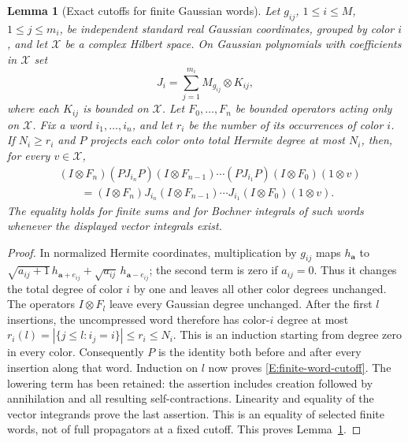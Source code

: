 \documentclass[12pt]{article}
\numberwithin{equation}{section}
\newtheorem{lemma}[theorem]{Lemma}
\theoremstyle{definition}
\begin{document}
\begin{lemma}[Exact cutoffs for finite Gaussian words]\label{L:finite-word-cutoff}
  Let $g_{ij}$, $1\le i\le M$, $1\le j\le m_i$, be independent
  standard real Gaussian coordinates, grouped by color $i$, and let
  $\mathscr X$ be a complex Hilbert space. On Gaussian polynomials
  with coefficients in $\mathscr X$ set
  \[
    J_i=\sum_{j=1}^{m_i}M_{g_{ij}}\otimes K_{ij},
  \]
  where each $K_{ij}$ is bounded on $\mathscr X$. Let
  $F_0,\ldots,F_n$ be bounded operators acting only on $\mathscr X$.
  Fix a word $i_1,\ldots,i_n$, and let $r_i$ be the number of its
  occurrences of color $i$. If $N_i\ge r_i$ and $P$ projects each
  color onto total Hermite degree at most $N_i$, then, for every
  $v\in\mathscr X$,
  \begin{equation}\label{E:finite-word-cutoff}
    \begin{split}
      &(I\otimes F_n)(PJ_{i_n}P)(I\otimes F_{n-1})\cdots
      (PJ_{i_1}P)(I\otimes F_0)(1\otimes v)\\
      &\qquad=(I\otimes F_n)J_{i_n}(I\otimes F_{n-1})\cdots
      J_{i_1}(I\otimes F_0)(1\otimes v).
    \end{split}
  \end{equation}
  The equality holds for finite sums and for Bochner integrals of such
  words whenever the displayed vector integrals exist.
\end{lemma}

\begin{proof}
  In normalized Hermite coordinates, multiplication by $g_{ij}$ maps
  $h_{\boldsymbol a}$ to
  $\sqrt{a_{ij}+1}\,h_{\boldsymbol a+e_{ij}}
  +\sqrt{a_{ij}}\,h_{\boldsymbol a-e_{ij}}$; the second term is zero
  if $a_{ij}=0$. Thus it changes the total degree of color $i$ by
  one and leaves all other color degrees unchanged. The operators
  $I\otimes F_l$ leave every Gaussian degree unchanged.
  After the first $l$ insertions, the uncompressed word therefore
  has color-$i$ degree at most
  $r_i(l)=|\{j\le l:i_j=i\}|\le r_i\le N_i$.
  This is an induction starting from degree zero in every color.
  Consequently $P$ is the identity both before and after every
  insertion along that word. Induction on $l$ now proves
  \eqref{E:finite-word-cutoff}. The lowering term has been retained:
  the assertion includes creation followed by annihilation and all
  resulting self-contractions. Linearity and equality of the vector
  integrands prove the last assertion. This is an equality of selected
  finite words, not of full propagators at a fixed cutoff.
  This proves Lemma~\ref{L:finite-word-cutoff}.
\end{proof}
\end{document}
